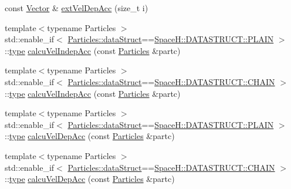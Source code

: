 \begin{DoxyCompactItemize}
\item 
const \mbox{\hyperlink{class_space_h_1_1_interaction_ad6d656d30b9272a5f690b0412a4a9a86}{Vector}} \& \mbox{\hyperlink{class_space_h_1_1_interaction_af1b751e13fc15bb66677fcf9459e95a0}{ext\+Vel\+Dep\+Acc}} (size\+\_\+t i)
\item 
{\footnotesize template$<$typename Particles $>$ }\\std\+::enable\+\_\+if$<$ \mbox{\hyperlink{class_vel_indep_particles_a6d357b21c216a2b079b1927c18de0b8f}{Particles\+::data\+Struct}}==\mbox{\hyperlink{namespace_space_h_a0af19f79a6498e99dbda772053d44a72af62eb0bf5e5c72e80983fbbac1cb70e5}{Space\+H\+::\+D\+A\+T\+A\+S\+T\+R\+U\+C\+T\+::\+P\+L\+A\+IN}} $>$\+::\mbox{\hyperlink{class_space_h_1_1_interaction_a0bed18b8b8efcb42be264a255f931be6}{type}} \mbox{\hyperlink{class_space_h_1_1_interaction_a89ebbf351411c3b9526c9890e4ff823c}{calcu\+Vel\+Indep\+Acc}} (const \mbox{\hyperlink{struct_particles}{Particles}} \&partc)
\item 
{\footnotesize template$<$typename Particles $>$ }\\std\+::enable\+\_\+if$<$ \mbox{\hyperlink{class_vel_indep_particles_a6d357b21c216a2b079b1927c18de0b8f}{Particles\+::data\+Struct}}==\mbox{\hyperlink{namespace_space_h_a0af19f79a6498e99dbda772053d44a72a014d2cf3cdc3af6f4f92c09190860e33}{Space\+H\+::\+D\+A\+T\+A\+S\+T\+R\+U\+C\+T\+::\+C\+H\+A\+IN}} $>$\+::\mbox{\hyperlink{class_space_h_1_1_interaction_a0bed18b8b8efcb42be264a255f931be6}{type}} \mbox{\hyperlink{class_space_h_1_1_interaction_a675bfa4741648047ff36592e08a62c32}{calcu\+Vel\+Indep\+Acc}} (const \mbox{\hyperlink{struct_particles}{Particles}} \&partc)
\item 
{\footnotesize template$<$typename Particles $>$ }\\std\+::enable\+\_\+if$<$ \mbox{\hyperlink{class_vel_indep_particles_a6d357b21c216a2b079b1927c18de0b8f}{Particles\+::data\+Struct}}==\mbox{\hyperlink{namespace_space_h_a0af19f79a6498e99dbda772053d44a72af62eb0bf5e5c72e80983fbbac1cb70e5}{Space\+H\+::\+D\+A\+T\+A\+S\+T\+R\+U\+C\+T\+::\+P\+L\+A\+IN}} $>$\+::\mbox{\hyperlink{class_space_h_1_1_interaction_a0bed18b8b8efcb42be264a255f931be6}{type}} \mbox{\hyperlink{class_space_h_1_1_interaction_aa7aa7148a435c420e86821ae319e68b0}{calcu\+Vel\+Dep\+Acc}} (const \mbox{\hyperlink{struct_particles}{Particles}} \&partc)
\item 
{\footnotesize template$<$typename Particles $>$ }\\std\+::enable\+\_\+if$<$ \mbox{\hyperlink{class_vel_indep_particles_a6d357b21c216a2b079b1927c18de0b8f}{Particles\+::data\+Struct}}==\mbox{\hyperlink{namespace_space_h_a0af19f79a6498e99dbda772053d44a72a014d2cf3cdc3af6f4f92c09190860e33}{Space\+H\+::\+D\+A\+T\+A\+S\+T\+R\+U\+C\+T\+::\+C\+H\+A\+IN}} $>$\+::\mbox{\hyperlink{class_space_h_1_1_interaction_a0bed18b8b8efcb42be264a255f931be6}{type}} \mbox{\hyperlink{class_space_h_1_1_interaction_a738430ac153d28064f0068c338cf061f}{calcu\+Vel\+Dep\+Acc}} (const \mbox{\hyperlink{struct_particles}{Particles}} \&partc)

\end{DoxyCompactItemize}
